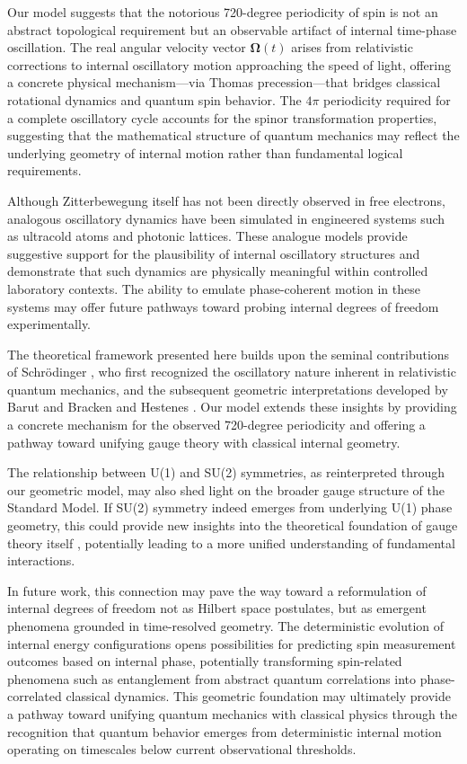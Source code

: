 \documentclass[%
 reprint,
 amsmath,amssymb,
 aps,
]{revtex4-1}
\numberwithin{equation}{section}%
\begin{document}
Our model suggests that the notorious 720-degree periodicity of spin is not an abstract topological requirement but an observable artifact of internal time-phase oscillation. The real angular velocity vector $\boldsymbol{\Omega}(t)$ arises from relativistic corrections to internal oscillatory motion approaching the speed of light, offering a concrete physical mechanism—via Thomas precession—that bridges classical rotational dynamics and quantum spin behavior. The $4\pi$ periodicity required for a complete oscillatory cycle accounts for the spinor transformation properties, suggesting that the mathematical structure of quantum mechanics may reflect the underlying geometry of internal motion rather than fundamental logical requirements.

Although Zitterbewegung itself has not been directly observed in free electrons, analogous oscillatory dynamics have been simulated in engineered systems such as ultracold atoms and photonic lattices. These analogue models provide suggestive support for the plausibility of internal oscillatory structures and demonstrate that such dynamics are physically meaningful within controlled laboratory contexts. The ability to emulate phase-coherent motion in these systems may offer future pathways toward probing internal degrees of freedom experimentally.

The theoretical framework presented here builds upon the seminal contributions of Schrödinger \cite{schrodinger1930}, who first recognized the oscillatory nature inherent in relativistic quantum mechanics, and the subsequent geometric interpretations developed by Barut and Bracken \cite{barut1981} and Hestenes \cite{hestenes1990}. Our model extends these insights by providing a concrete mechanism for the observed 720-degree periodicity and offering a pathway toward unifying gauge theory with classical internal geometry.

The relationship between U(1) and SU(2) symmetries, as reinterpreted through our geometric model, may also shed light on the broader gauge structure of the Standard Model. If SU(2) symmetry indeed emerges from underlying U(1) phase geometry, this could provide new insights into the theoretical foundation of gauge theory itself \cite{utiyama1956}, potentially leading to a more unified understanding of fundamental interactions.

In future work, this connection may pave the way toward a reformulation of internal degrees of freedom not as Hilbert space postulates, but as emergent phenomena grounded in time-resolved geometry. The deterministic evolution of internal energy configurations opens possibilities for predicting spin measurement outcomes based on internal phase, potentially transforming spin-related phenomena such as entanglement from abstract quantum correlations into phase-correlated classical dynamics. This geometric foundation may ultimately provide a pathway toward unifying quantum mechanics with classical physics through the recognition that quantum behavior emerges from deterministic internal motion operating on timescales below current observational thresholds.
\end{document}
